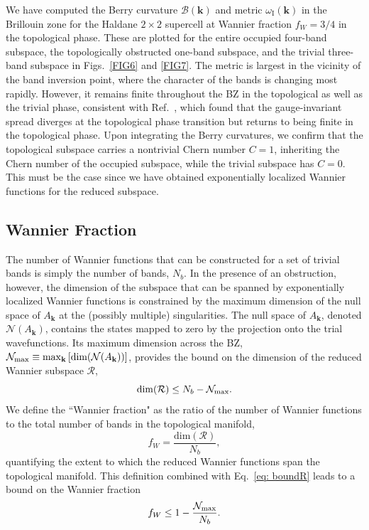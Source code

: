 \documentclass[galley,aps,pra,10pt,amsmath,amssymb,
    superscriptaddress,nofootinbib,longbibliography]{revtex4-2}
\begin{document}
We have computed the Berry curvature $\mathcal{B}(\textbf{k})$ and metric $\omega_\textrm{I}(\textbf{k})$ in the Brillouin zone for the Haldane $2\times2$ supercell at Wannier fraction $f_W=3/4$ in the topological phase. These are plotted for the entire occupied four-band subspace, the topologically obstructed one-band subspace, and the trivial three-band subspace in Figs.~\ref{FIG6} and \ref{FIG7}. The metric is largest in the vicinity of the band inversion point, where the character of the bands is changing most rapidly. However, it remains finite throughout the BZ in the topological as well as the trivial phase, consistent with Ref.~\cite{thronhauser2006}, which found that the gauge-invariant spread diverges at the topological phase transition but returns to being finite in the topological phase. Upon integrating the Berry curvatures, we confirm that the topological subspace carries a nontrivial Chern number $C=1$, inheriting the Chern number of the occupied subspace, while the trivial subspace has $C=0$. This must be the case since we have obtained exponentially localized Wannier functions for the reduced subspace. 


\subsection{Wannier Fraction}
\label{ss:WF}

The number of Wannier functions that can be constructed for a set of trivial bands is simply the number of bands, $N_b$. In the presence of an obstruction, however, the dimension of the subspace that can be spanned by exponentially localized Wannier functions is constrained by the maximum dimension of the null space of $A_{\mathbf{k}}$ at the (possibly multiple) singularities. The null space of $A_{\mathbf{k}}$, denoted $\mathcal{N}(A_{\mathbf{k}})$, contains the states mapped to zero by the projection onto the trial wavefunctions. Its maximum dimension across the BZ, $\mathcal{N}_{\rm max} \equiv \max_{\mathbf{k}}\left[ \text{dim}(\mathcal{N}(A_\mathbf{k})) \right]$, provides the bound on the dimension of the reduced Wannier subspace $\mathcal{R}$,
\begin{equation}
\label{eq: boundR}
    \dim({\mathcal{R}}) \leq N_b - \mathcal{N}_{\rm max}.
\end{equation}
We define the ``Wannier fraction" as the ratio of the number of Wannier functions to the total number of bands in the topological manifold,
\begin{equation}
    f_{W} = \frac{\text{dim}(\mathcal{R})}{N_b},
\end{equation}
quantifying the extent to which the reduced Wannier functions span the topological manifold. This definition combined with Eq.~\ref{eq: boundR} leads to a bound on the Wannier fraction
\begin{equation}
    f_W \leq 1 - \frac{ \mathcal{N}_{\rm max}}{N_b}.
\end{equation}
\end{document}
